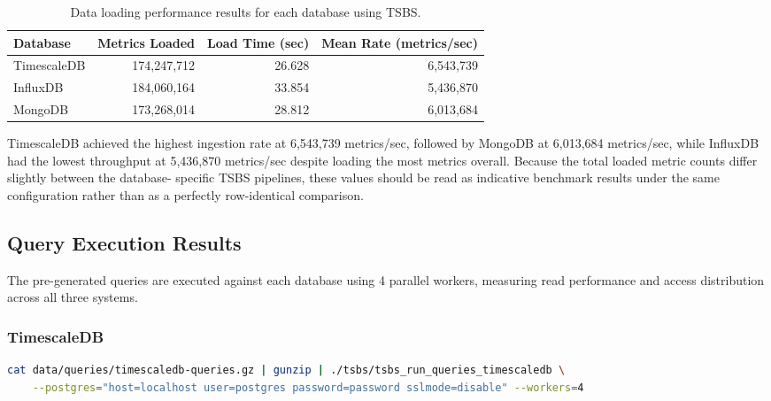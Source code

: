 \begin{table}[ht!]
    \centering
    \begin{tabular}{|l|r|r|r|} %
        \hline %
        \textbf{Database} & \textbf{Metrics Loaded} & \textbf{Load Time (sec)} & \textbf{Mean Rate (metrics/sec)} \\
        \hline %
        TimescaleDB       & 174,247,712             & 26.628                   & 6,543,739                        \\
        InfluxDB          & 184,060,164             & 33.854                   & 5,436,870                        \\
        MongoDB           & 173,268,014             & 28.812                   & 6,013,684                        \\
        \hline %
    \end{tabular}
    \caption{Data loading performance results for each database using TSBS.}\label{tab:tsbs-data-loading-results}
\end{table}

TimescaleDB achieved the highest ingestion rate at 6,543,739 metrics/sec,
followed by MongoDB at 6,013,684 metrics/sec, while InfluxDB had the lowest
throughput at 5,436,870 metrics/sec despite loading the most metrics overall.
Because the total loaded metric counts differ slightly between the database-
specific TSBS pipelines, these values should be read as indicative benchmark
results under the same configuration rather than as a perfectly row-identical
comparison.



\subsection{Query Execution Results}

The pre-generated queries are executed against each database using 4 parallel
workers, measuring read performance and access distribution across all three
systems.

\subsubsection{TimescaleDB}

\begin{lstlisting}[language=bash, caption={Command to execute queries against TimescaleDB using TSBS.}, label={lst:tsbs-query-timescaledb}, float]
cat data/queries/timescaledb-queries.gz | gunzip | ./tsbs/tsbs_run_queries_timescaledb \
    --postgres="host=localhost user=postgres password=password sslmode=disable" --workers=4
\end{lstlisting}

